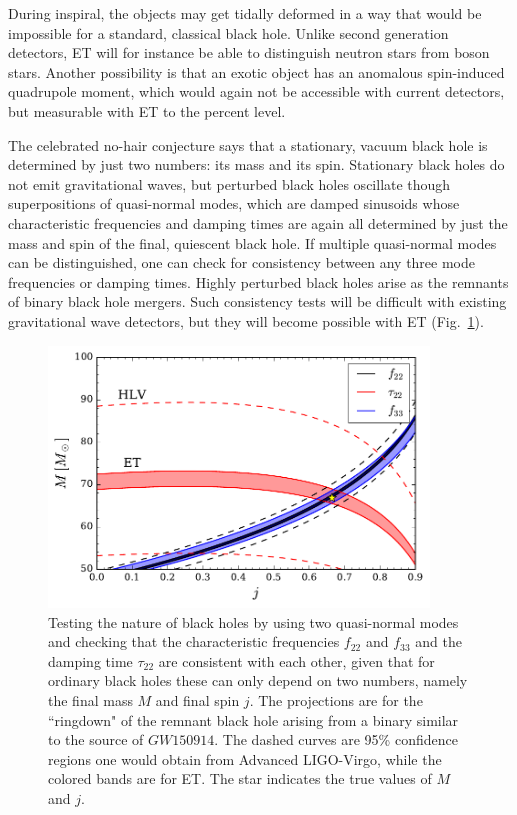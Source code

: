 During inspiral, the objects may get tidally deformed in a way that would be impossible 
for a standard, classical black hole. Unlike second generation detectors, ET will for instance be able 
to distinguish neutron stars from boson stars.  
Another possibility is that an exotic object 
has an anomalous spin-induced quadrupole moment, which would again not be accessible with 
current detectors, but measurable with ET to the percent level.

The celebrated no-hair conjecture says that a stationary, vacuum black hole is determined
by just two numbers: its mass and its spin. Stationary black holes do not emit
gravitational waves, but perturbed black holes oscillate though superpositions of
quasi-normal modes, which are damped sinusoids whose characteristic frequencies and damping times 
are again all determined by just the mass and spin of the final, quiescent black hole. If 
multiple quasi-normal modes can be distinguished, one can check for consistency between any 
three mode frequencies or damping times. Highly perturbed black holes arise as the 
remnants of binary black hole mergers. Such consistency tests will be difficult with existing gravitational 
wave detectors, but they will become possible with ET (Fig.~\ref{fig:ringdown}).

\begin{figure}[h!]
\centering
\includegraphics[width=0.9\textwidth]{Figures/3g_ringdown.pdf}
\caption{Testing the nature of black holes by using two quasi-normal modes and checking
that the characteristic frequencies $f_{22}$ and $f_{33}$ and the damping time $\tau_{22}$ are consistent
with each other, given that for ordinary black holes these can only depend on two numbers, namely
the final mass $M$ and final spin $j$. The projections are for the ``ringdown" of the remnant
black hole arising from a binary similar to the source of $GW150914$. The dashed curves 
are 95\% confidence regions one would obtain from Advanced LIGO-Virgo, while the colored bands
are for ET. The star indicates the true values of $M$ and $j$.
}
\label{fig:ringdown}
\end{figure} 

